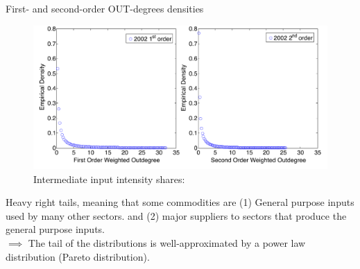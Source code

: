 \documentclass{beamer}
\begin{document}
\begin{frame}{First- and second-order OUT-degrees densities}
    \justifying
    \begin{figure}[H]
        \caption*{ Intermediate input intensity shares:}
        \includegraphics[scale=0.6]{5}
        \centering
    \end{figure}  

Heavy right tails, meaning that some commodities are (1) General purpose inputs used by many other sectors.
and (2) major suppliers to sectors that produce the general purpose inputs.\\[5pt]

$\implies$ The tail of the distributions is well-approximated by a power law
distribution (Pareto distribution).

\end{frame}
\end{document}
